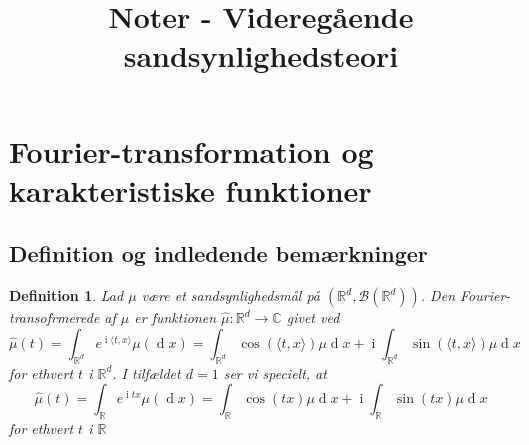 \documentclass{article}
\title{Noter - Videregående sandsynlighedsteori}
\newcommand{\R}{\mathbb{R}}
\newcommand{\1}{\mathbbm{1}}
\newtheorem{definition}[theorem]{Definition}
\theoremstyle{boxed}
\begin{document}
\section{Fourier-transformation og karakteristiske funktioner}
\subsection{Definition og indledende bemærkninger}
\begin{theorem-box}
\begin{definition}
    Lad $\mu$ være et sandsynlighedsmål på $(\R^d, \mathcal{B}(\R^d))$. Den Fourier-transofrmerede af $\mu$ er funktionen $\hat{\mu}:\R^d\rightarrow \mathbb{C}$ givet ved 
    $$\hat{\mu}(t)=\int_{\R^d}e^{\operatorname{i}\langle t,x\rangle}\mu(\operatorname{d}x)=\int_{\R^d}\cos(\langle t,x\rangle)\mu \operatorname{d}x+\operatorname{i}\int_{\R^d}\sin(\langle t,x\rangle)\mu \operatorname{d}x$$
    for ethvert $t$ i $\R^d$. I tilfældet $d=1$ ser vi specielt, at 
    $$\hat{\mu}(t)=\int_{\R}e^{\operatorname{i}tx}\mu(\operatorname{d}x)=\int_{\R}\cos(tx)\mu \operatorname{d}x+\operatorname{i}\int_{\R}\sin(tx)\mu \operatorname{d}x$$
    for ethvert $t$ i $\R$
\end{definition}
\end{theorem-box}
\end{document}
